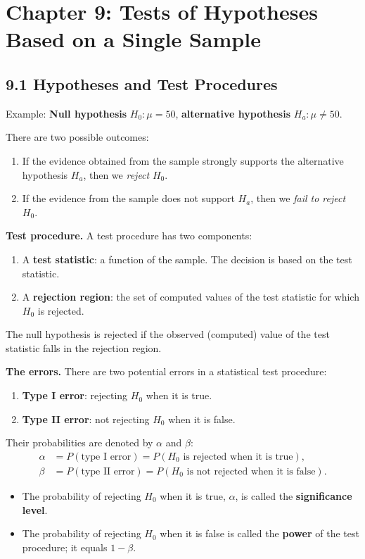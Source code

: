 \section*{Chapter 9: Tests of Hypotheses Based on a Single Sample}

\subsection*{9.1 Hypotheses and Test Procedures}

Example: \textbf{Null hypothesis} $H_0:\mu = 50$, \textbf{alternative hypothesis} $H_a:\mu \neq 50$.

There are two possible outcomes:
\begin{enumerate}
  \item If the evidence obtained from the sample strongly supports the alternative
        hypothesis $H_a$, then we \emph{reject} $H_0$.
  \item If the evidence from the sample does not support $H_a$, then we
        \emph{fail to reject} $H_0$.
\end{enumerate}

\textbf{Test procedure.} A test procedure has two components:
\begin{enumerate}
  \item A \textbf{test statistic}: a function of the sample. The decision is based on the test statistic.
  \item A \textbf{rejection region}: the set of computed values of the test statistic for which $H_0$ is rejected.
\end{enumerate}
The null hypothesis is rejected if the observed (computed) value of the test
statistic falls in the rejection region.

\textbf{The errors.} There are two potential errors in a statistical test procedure:
\begin{enumerate}
  \item \textbf{Type I error}: rejecting $H_0$ when it is true.
  \item \textbf{Type II error}: not rejecting $H_0$ when it is false.
\end{enumerate}
Their probabilities are denoted by $\alpha$ and $\beta$:
\begin{align*}
\alpha &= P(\text{type I error}) = P(H_0 \text{ is rejected when it is true}),\\
\beta  &= P(\text{type II error}) = P(H_0 \text{ is not rejected when it is false}).
\end{align*}
\begin{itemize}
  \item The probability of rejecting $H_0$ when it is true, $\alpha$, is called the \textbf{significance level}.
  \item The probability of rejecting $H_0$ when it is false is called the \textbf{power} of the test procedure; it equals $1-\beta$.
\end{itemize}

